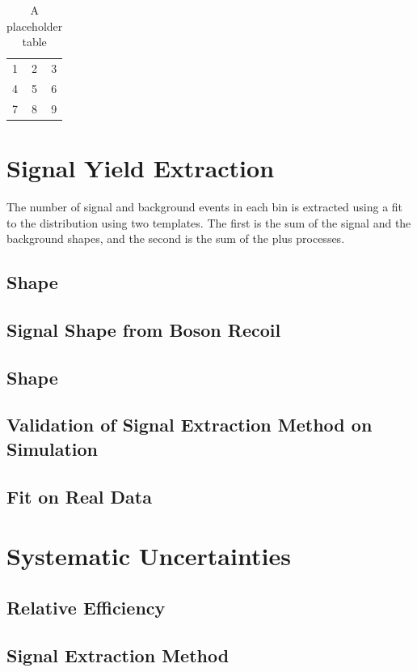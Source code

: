 \begin{table}[htb]
  \caption{A placeholder table}
  \label{asym36:selectedcomp}
  \centering
  \begin{tabular}{| l c r |}
    \hline
    1 & 2 & 3 \\
    4 & 5 & 6 \\
    7 & 8 & 9 \\
  \hline
  \end{tabular}
\end{table}


\section{Signal Yield Extraction}

The number of signal and background events in each bin is extracted using a fit
to the \ETm distribution using two templates.
The first is the sum of the \Wenu signal and the \EWK background shapes,
and the second is the sum of the \QCD plus \gjet processes.

\subsection{\QCD \ETm Shape}
\subsection{Signal \ETm Shape from Boson Recoil}
\subsection{\EWK \ETm Shape}
\subsection{Validation of Signal Extraction Method on Simulation}
\subsection{Fit on Real Data}

\section{Systematic Uncertainties}
\subsection{Relative Efficiency}
\subsection{Signal Extraction Method}
